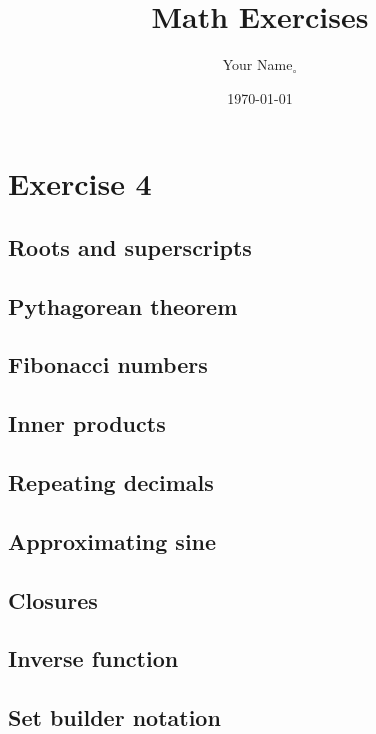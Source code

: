 \documentclass[11pt]{amsart}
\begin{document}
\title{Math Exercises}
\author{Your Name$_\circ$}
\date{\today}

\maketitle

\section{Exercise 4}

\subsection{Roots and superscripts}


\subsection{Pythagorean theorem}


\subsection{Fibonacci numbers}


\subsection{Inner products}


\subsection{Repeating decimals}


\subsection{Approximating sine}


\subsection{Closures}


\subsection{Inverse function}


\subsection{Set builder notation}
\end{document}
